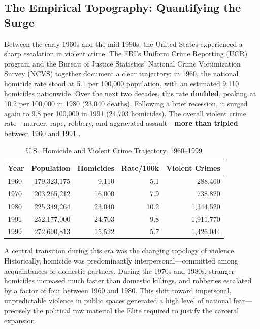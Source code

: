 \subsection{The Empirical Topography: Quantifying the Surge}

Between the early 1960s and the mid-1990s, the United States experienced a sharp escalation in violent crime. The FBI's Uniform Crime Reporting (UCR) program and the Bureau of Justice Statistics' National Crime Victimization Survey (NCVS) together document a clear trajectory: in 1960, the national homicide rate stood at 5.1 per 100,000 population, with an estimated 9,110 homicides nationwide. Over the next two decades, this rate \textbf{doubled}, peaking at 10.2 per 100,000 in 1980 (23,040 deaths). Following a brief recession, it surged again to 9.8 per 100,000 in 1991 (24,703 homicides). The overall violent crime rate---murder, rape, robbery, and aggravated assault---\textbf{more than tripled} between 1960 and 1991 \cite{ucr_historical, bjs_ncvs}.

\begin{table}[htbp]
\centering
\small
\caption{U.S.\ Homicide and Violent Crime Trajectory, 1960--1999}
\label{tab:crime_surge}
\begin{tabular}{lrrrr}
\toprule
\textbf{Year} & \textbf{Population} & \textbf{Homicides} & \textbf{Rate/100k} & \textbf{Violent Crimes} \\
\midrule
1960 & 179,323,175 & 9,110 & 5.1 & 288,460 \\
1970 & 203,265,212 & 16,000 & 7.9 & 738,820 \\
1980 & 225,349,264 & 23,040 & 10.2 & 1,344,520 \\
1991 & 252,177,000 & 24,703 & 9.8 & 1,911,770 \\
1999 & 272,690,813 & 15,522 & 5.7 & 1,426,044 \\
\bottomrule
\end{tabular}
\end{table}

A central transition during this era was the changing topology of violence. Historically, homicide was predominantly interpersonal---committed among acquaintances or domestic partners. During the 1970s and 1980s, stranger homicides increased much faster than domestic killings, and robberies escalated by a factor of four between 1960 and 1980. This shift toward impersonal, unpredictable violence in public spaces generated a high level of national fear---precisely the political raw material the Elite required to justify the carceral expansion.

